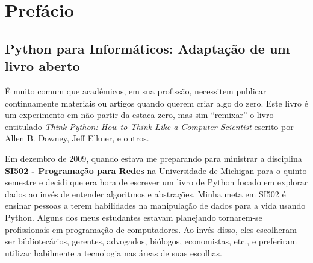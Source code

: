
\chapter{Prefácio}

\section*{Python para Informáticos: Adaptação de um livro aberto}

É muito comum que acadêmicos, em sua profissão, necessitem publicar continuamente 
materiais ou artigos quando querem criar algo do zero. 
Este livro é um experimento em não partir da estaca zero, mas sim ``remixar''
o livro entitulado \emph{Think Python: How to Think Like
a Computer Scientist} escrito por Allen B. Downey, Jeff Elkner, e outros.

Em dezembro de 2009, quando estava me preparando para ministrar a disciplina
{\bf SI502 - Programação para Redes} na Universidade de Michigan
para o quinto semestre e decidi que era hora de escrever um livro de Python 
focado em explorar dados ao invés de entender algoritmos e 
abstrações.
Minha meta em SI502 é ensinar pessoas a terem habilidades na manipulação de dados 
para a vida usando Python.  Alguns dos meus estudantes estavam planejando tornarem-se 
profissionais em programação de computadores.  Ao invés disso, eles
escolheram ser bibliotecários, gerentes, advogados, biólogos, economistas, etc., 
e preferiram utilizar habilmente a tecnologia nas áreas de suas escolhas.

